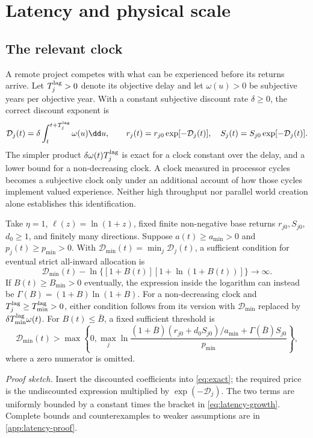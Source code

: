 \section{Latency and physical scale}
\label{sec:latency}
\subsection{The relevant clock}
A remote project competes with what can be experienced before its returns
arrive. Let $T_j^{\rm lag}>0$ denote its objective delay and let
$\omega(u)>0$ be subjective years per objective year. With a constant
subjective discount rate $\delta\geq0$, the correct discount exponent is
\begin{equation}
 \mathcal D_j(t)=\delta\int_t^{t+T_j^{\rm lag}}\omega(u)\dd u,
 \qquad r_j(t)=r_{j0}\exp[-\mathcal D_j(t)],\quad
 S_j(t)=S_{j0}\exp[-\mathcal D_j(t)].
 \label{eq:subjective-delay}
\end{equation}
The simpler product $\delta\omega(t)T_j^{\rm lag}$ is exact for a clock
constant over the delay, and a lower bound for a non-decreasing clock.
A clock measured in processor cycles becomes a subjective clock only
under an additional account of how those cycles implement valued
experience. Neither high throughput nor parallel world creation alone
establishes this identification.

\begin{proposition}
\label{prop:latency}
Take $\eta=1$, $\ell(z)=\ln(1+z)$, fixed finite non-negative base returns
$r_{j0},S_{j0}$, $d_0\geq1$, and finitely many directions. Suppose
$a(t)\geq a_{\min}>0$ and $p_j(t)\geq p_{\min}>0$. With
$\mathcal D_{\min}(t)=\min_j\mathcal D_j(t)$, a sufficient condition for eventual strict
all-inward allocation is
\begin{equation}
 \mathcal D_{\min}(t)-\ln\{[1+B(t)][1+\ln(1+B(t))]\}\longrightarrow\infty.
 \label{eq:latency-growth}
\end{equation}
If $B(t)\geq B_{\min}>0$ eventually, the expression inside the logarithm
can instead be $\Gamma(B)=(1+B)\ln(1+B)$. For a non-decreasing clock
and $T_j^{\rm lag}\geq T_{\min}^{\rm lag}>0$, either condition follows
from its version with $\mathcal D_{\min}$ replaced by
$\delta T_{\min}^{\rm lag}\omega(t)$.
For $B(t)\leq\bar B$, a fixed sufficient threshold is
\begin{equation}
 \mathcal D_{\min}(t)>
 \max\left\{0,\max_j\ln\frac{(1+\bar B)(r_{j0}+d_0S_{j0})/a_{\min}
                   +\Gamma(\bar B)S_{j0}}{p_{\min}}\right\},
 \label{eq:latency-bounded}
\end{equation}
where a zero numerator is omitted.
\end{proposition}
\noindent\emph{Proof sketch.}
Insert the discounted coefficients into \cref{eq:exact}; the required
price is the undiscounted expression multiplied by $\exp(-\mathcal D_j)$.
The two terms are uniformly bounded by a constant times the bracket in
\cref{eq:latency-growth}. Complete bounds and counterexamples to weaker
assumptions are in \cref{app:latency-proof}.

